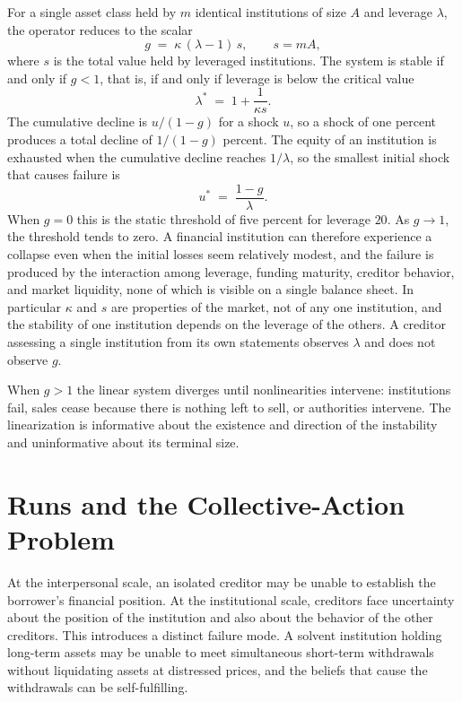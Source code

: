 \documentclass[11pt]{article}
\theoremstyle{definition}
\theoremstyle{remark}
\begin{document}
For a single asset class held by $m$ identical institutions of size $A$ and leverage $\lambda$, the operator reduces to the scalar
\[
g \;=\; \kappa\,(\lambda-1)\,s,\qquad s=mA ,
\]
where $s$ is the total value held by leveraged institutions. The system is stable if and only if $g<1$, that is, if and only if leverage is below the critical value
\[
\lambda^\ast \;=\; 1+\frac{1}{\kappa s}.
\]
The cumulative decline is $u/(1-g)$ for a shock $u$, so a shock of one percent produces a total decline of $1/(1-g)$ percent. The equity of an institution is exhausted when the cumulative decline reaches $1/\lambda$, so the smallest initial shock that causes failure is
\[
u^\ast \;=\; \frac{1-g}{\lambda}.
\]
When $g=0$ this is the static threshold of five percent for leverage $20$. As $g\to 1$, the threshold tends to zero. A financial institution can therefore experience a collapse even when the initial losses seem relatively modest, and the failure is produced by the interaction among leverage, funding maturity, creditor behavior, and market liquidity, none of which is visible on a single balance sheet. In particular $\kappa$ and $s$ are properties of the market, not of any one institution, and the stability of one institution depends on the leverage of the others. A creditor assessing a single institution from its own statements observes $\lambda$ and does not observe $g$.

When $g>1$ the linear system diverges until nonlinearities intervene: institutions fail, sales cease because there is nothing left to sell, or authorities intervene. The linearization is informative about the existence and direction of the instability and uninformative about its terminal size.

\section{Runs and the Collective-Action Problem}\label{sec:runs}

At the interpersonal scale, an isolated creditor may be unable to establish the borrower's financial position. At the institutional scale, creditors face uncertainty about the position of the institution and also about the behavior of the other creditors. This introduces a distinct failure mode. A solvent institution holding long-term assets may be unable to meet simultaneous short-term withdrawals without liquidating assets at distressed prices, and the beliefs that cause the withdrawals can be self-fulfilling.
\end{document}
